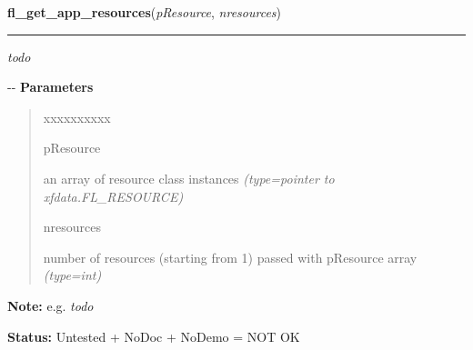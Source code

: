     \label{xformslib:flxbasic:fl_get_app_resources}

    \vspace{0.5ex}

\hspace{.8\funcindent}\begin{boxedminipage}{\funcwidth}

    \raggedright \textbf{fl\_get\_app\_resources}(\textit{pResource}, \textit{nresources})

    \vspace{-1.5ex}

    \rule{\textwidth}{0.5\fboxrule}
\setlength{\parskip}{2ex}

\emph{todo}

-{}-
\setlength{\parskip}{1ex}
      \textbf{Parameters}
      \vspace{-1ex}

      \begin{quote}
        \begin{Ventry}{xxxxxxxxxx}

          \item[pResource]


an array of resource class instances
            {\it (type=pointer to xfdata.FL\_RESOURCE)}

          \item[nresources]


number of resources (starting from 1) passed with pResource array
            {\it (type=int)}

        \end{Ventry}

      \end{quote}

\textbf{Note:} 
e.g. \emph{todo}


\textbf{Status:} 
Untested + NoDoc + NoDemo = NOT OK


    \end{boxedminipage}

    \label{xformslib:flxbasic:fl_set_graphics_mode}

    \vspace{0.5ex}


